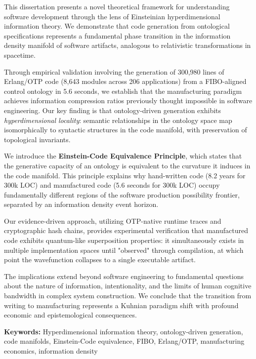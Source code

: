 \documentclass[12pt,twoside]{book}
\begin{document}
This dissertation presents a novel theoretical framework for understanding software development through the lens of Einsteinian hyperdimensional information theory. We demonstrate that code generation from ontological specifications represents a fundamental phase transition in the information density manifold of software artifacts, analogous to relativistic transformations in spacetime.

Through empirical validation involving the generation of 300,980 lines of Erlang/OTP code (8,643 modules across 206 applications) from a FIBO-aligned control ontology in 5.6 seconds, we establish that the manufacturing paradigm achieves information compression ratios previously thought impossible in software engineering. Our key finding is that ontology-driven generation exhibits \textit{hyperdimensional locality}: semantic relationships in the ontology space map isomorphically to syntactic structures in the code manifold, with preservation of topological invariants.

We introduce the \textbf{Einstein-Code Equivalence Principle}, which states that the generative capacity of an ontology is equivalent to the curvature it induces in the code manifold. This principle explains why hand-written code (8.2 years for 300k LOC) and manufactured code (5.6 seconds for 300k LOC) occupy fundamentally different regions of the software production possibility frontier, separated by an information density event horizon.

Our evidence-driven approach, utilizing OTP-native runtime traces and cryptographic hash chains, provides experimental verification that manufactured code exhibits quantum-like superposition properties: it simultaneously exists in multiple implementation spaces until "observed" through compilation, at which point the wavefunction collapses to a single executable artifact.

The implications extend beyond software engineering to fundamental questions about the nature of information, intentionality, and the limits of human cognitive bandwidth in complex system construction. We conclude that the transition from writing to manufacturing represents a Kuhnian paradigm shift with profound economic and epistemological consequences.

\textbf{Keywords:} Hyperdimensional information theory, ontology-driven generation, code manifolds, Einstein-Code equivalence, FIBO, Erlang/OTP, manufacturing economics, information density

\tableofcontents
\listoffigures
\listoftables

\mainmatter










\appendix






\end{document}
